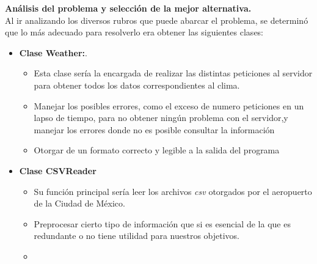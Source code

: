 \documentclass[letterpaper]{article}
\begin{document}
\textbf{Análisis del problema y selección de la mejor alternativa. }\\
Al ir analizando los diversos rubros que puede abarcar el problema, se determinó que lo más adecuado para resolverlo era obtener las siguientes clases:
\begin{itemize}
	\item \textbf{Clase Weather:}.
	\begin{itemize}
		\item Esta clase sería la encargada de realizar las distintas peticiones al servidor para obtener todos los datos correspondientes al clima.
		\item Manejar los posibles errores, como el exceso de numero peticiones en un lapso de tiempo, para no obtener ningún problema con el servidor,y manejar los errores donde no es posible consultar la información
		\item Otorgar de un formato correcto y legible a la salida del programa
	\end{itemize}
	\item \textbf{Clase CSVReader}
	\begin{itemize}
		\item Su función principal sería leer los archivos \textit{csv} otorgados por el aeropuerto de la Ciudad de México.  
		\item Preprocesar cierto tipo de información que si es esencial de la que es redundante o no tiene utilidad para nuestros objetivos.
		\item
		
	\end{itemize}
\end{itemize}
\end{document}
